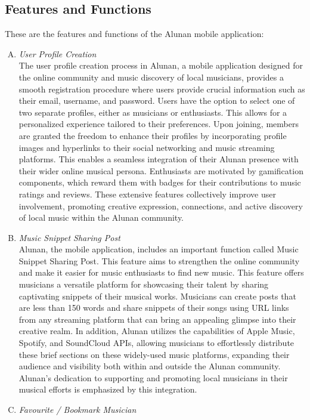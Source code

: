 \subsection{Features and Functions}
These are the features and functions of the Alunan mobile application:
\begin{enumerate}[A.]
    \item \textit{User Profile Creation}\\
    The user profile creation process in Alunan, a mobile application designed for the online community and music discovery of local musicians, provides a smooth registration procedure where users provide crucial information such as their email, username, and password. Users have the option to select one of two separate profiles, either as musicians or enthusiasts. This allows for a personalized experience tailored to their preferences. Upon joining, members are granted the freedom to enhance their profiles by incorporating profile images and hyperlinks to their social networking and music streaming platforms. This enables a seamless integration of their Alunan presence with their wider online musical persona. Enthusiasts are motivated by gamification components, which reward them with badges for their contributions to music ratings and reviews. These extensive features collectively improve user involvement, promoting creative expression, connections, and active discovery of local music within the Alunan community.
    \item \textit{Music Snippet Sharing Post}\\
    Alunan, the mobile application, includes an important function called Music Snippet Sharing Post. This feature aims to strengthen the online community and make it easier for music enthusiasts to find new music. This feature offers musicians a versatile platform for showcasing their talent by sharing captivating snippets of their musical works. Musicians can create posts that are less than 150 words and share snippets of their songs using URL links from any streaming platform that can bring an appealing glimpse into their creative realm. In addition, Alunan utilizes the capabilities of Apple Music, Spotify, and SoundCloud APIs, allowing musicians to effortlessly distribute these brief sections on these widely-used music platforms, expanding their audience and visibility both within and outside the Alunan community. Alunan's dedication to supporting and promoting local musicians in their musical efforts is emphasized by this integration.
    \item \textit{Favourite / Bookmark Musician}\\

\end{enumerate}
